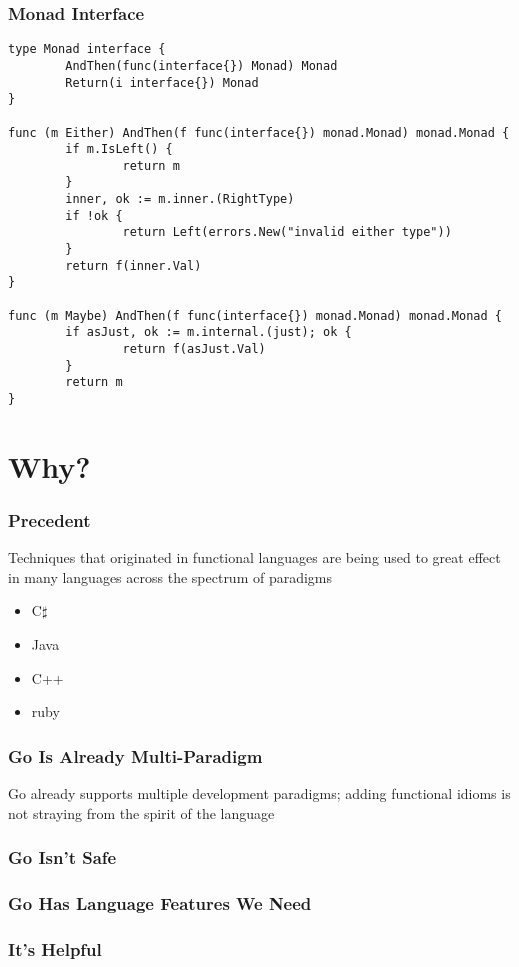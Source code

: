 \documentclass{beamer}
\begin{document}
\begin{frame}[fragile]
  \frametitle{Monad Interface}
\begin{lstlisting}
type Monad interface {
        AndThen(func(interface{}) Monad) Monad
        Return(i interface{}) Monad
}

func (m Either) AndThen(f func(interface{}) monad.Monad) monad.Monad {
        if m.IsLeft() {
                return m
        }
        inner, ok := m.inner.(RightType)
        if !ok {
                return Left(errors.New("invalid either type"))
        }
        return f(inner.Val)
}

func (m Maybe) AndThen(f func(interface{}) monad.Monad) monad.Monad {
        if asJust, ok := m.internal.(just); ok {
                return f(asJust.Val)
        }
        return m
}
\end{lstlisting}
\end{frame}



\section{Why?}
\begin{frame}
  \frametitle{Precedent}
  Techniques that originated in functional languages are being used to
  great effect in many languages across the spectrum of paradigms

  \begin{itemize}
  \item C$\sharp$
  \item Java
  \item C++
  \item ruby
  \end{itemize}
\end{frame}

\begin{frame}
  \frametitle{Go Is Already Multi-Paradigm}
  Go already supports multiple development paradigms; adding
  functional idioms is not straying from the spirit of the language
\end{frame}

\begin{frame}
  \frametitle{Go Isn't Safe}

\end{frame}

\begin{frame}
  \frametitle{Go Has Language Features We Need}

\end{frame}

\begin{frame}
  \frametitle{It's Helpful}

\end{frame}
\end{document}
